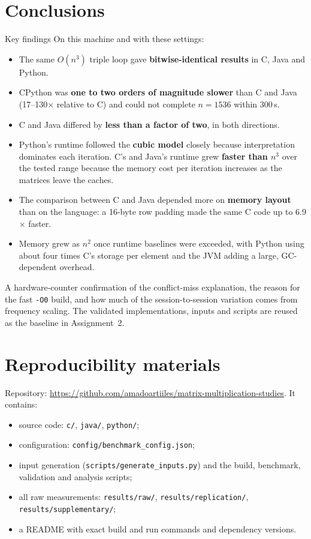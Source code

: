 \documentclass[11pt,a4paper]{article}
\newcommand{\concept}[1]{\par\addvspace{8pt}\Needspace{5\baselineskip}%
  \noindent{\color{accent}\bfseries\boldmath #1}\par\nopagebreak\vspace{2pt}}
\newcommand{\RepoURL}{https://github.com/amadoartiiles/matrix-multiplication-studies}
\begin{document}
\section{Conclusions}
\begin{titledbox}{Key findings}
On this machine and with these settings:
\begin{itemize}[leftmargin=1.2em]
  \item The same $O(n^3)$ triple loop gave \textbf{bitwise-identical results} in C, Java and Python.
  \item CPython was \textbf{one to two orders of magnitude slower} than C and Java (17--130$\times$
        relative to C) and could not complete $n=1536$ within 300\,s.
  \item C and Java differed by \textbf{less than a factor of two}, in both directions.
  \item Python's runtime followed the \textbf{cubic model} closely because interpretation dominates
        each iteration. C's and Java's runtime grew \textbf{faster than $n^3$} over the tested range
        because the memory cost per iteration increases as the matrices leave the caches.
  \item The comparison between C and Java depended more on \textbf{memory layout} than on the
        language: a 16-byte row padding made the same C code up to 6.9$\times$ faster.
  \item Memory grew as \textbf{$n^2$} once runtime baselines were exceeded, with Python using about
        four times C's storage per element and the JVM adding a large, GC-dependent overhead.
\end{itemize}
\end{titledbox}

\concept{Open questions}
A hardware-counter confirmation of the conflict-miss explanation, the reason for the
fast \texttt{-O0} build, and how much of the session-to-session variation comes from frequency
scaling. The validated implementations, inputs and scripts are reused as the baseline in
Assignment~2.

\section*{Reproducibility materials}
Repository: \url{\RepoURL}. It contains:
\begin{itemize}[leftmargin=1.4em]
  \item source code: \texttt{c/}, \texttt{java/}, \texttt{python/};
  \item configuration: \texttt{config/benchmark\_config.json};
  \item input generation (\texttt{scripts/generate\_inputs.py}) and the build, benchmark, validation
        and analysis scripts;
  \item all raw measurements: \texttt{results/raw/}, \texttt{results/replication/},
        \texttt{results/supplementary/};
  \item a README with exact build and run commands and dependency versions.
\end{itemize}
\end{document}
